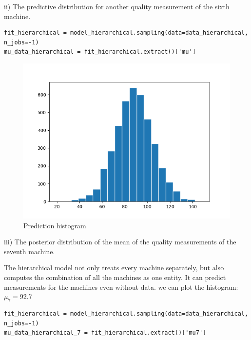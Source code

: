 \documentclass{article}
\begin{document}
ii) The predictive distribution for another quality measurement of the sixth machine.

\begin{verbatim}  
fit_hierarchical = model_hierarchical.sampling(data=data_hierarchical, n_jobs=-1)
mu_data_hierarchical = fit_hierarchical.extract()['mu']
\end{verbatim}

\begin{figure}[H]
\centering  
\includegraphics[scale=0.5]{hierarchical_hist.png}
\caption{Prediction histogram}
\label{fig: label}
\end{figure}

iii) The posterior distribution of the mean of the quality measurements of the seventh machine.

The hierarchical model not only treats every machine separately, but also computes the combination of all the machines as one entity. It can predict measurements for the machines even without data. we can plot the histogram:
$\mu_7=92.7$

\begin{verbatim}  
fit_hierarchical = model_hierarchical.sampling(data=data_hierarchical, n_jobs=-1)
mu_data_hierarchical_7 = fit_hierarchical.extract()['mu7']
\end{verbatim}
\end{document}

